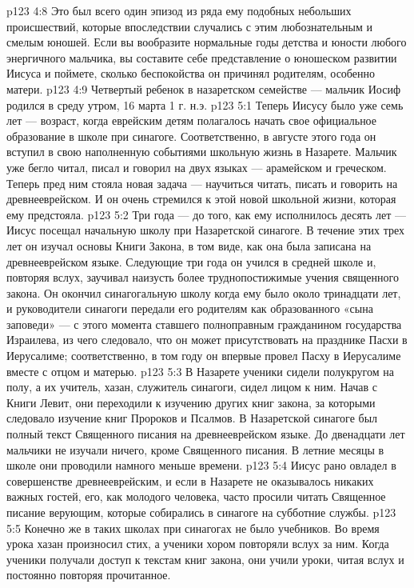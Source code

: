 \vs p123 4:8 Это был всего один эпизод из ряда ему подобных небольших происшествий, которые впоследствии случались с этим любознательным и смелым юношей. Если вы вообразите нормальные годы детства и юности любого энергичного мальчика, вы составите себе представление о юношеском развитии Иисуса и поймете, сколько беспокойства он причинял родителям, особенно матери.
\vs p123 4:9 \pc Четвертый ребенок в назаретском семействе --- мальчик Иосиф родился в среду утром, 16 марта 1 г. н.э.
\vs p123 5:1 Теперь Иисусу было уже семь лет --- возраст, когда еврейским детям полагалось начать свое официальное образование в школе при синагоге. Соответственно, в августе этого года он вступил в свою наполненную событиями школьную жизнь в Назарете. Мальчик уже бегло читал, писал и говорил на двух языках --- арамейском и греческом. Теперь пред ним стояла новая задача --- научиться читать, писать и говорить на древнееврейском. И он очень стремился к этой новой школьной жизни, которая ему предстояла.
\vs p123 5:2 Три года --- до того, как ему исполнилось десять лет --- Иисус посещал начальную школу при Назаретской синагоге. В течение этих трех лет он изучал основы Книги Закона, в том виде, как она была записана на древнееврейском языке. Следующие три года он учился в средней школе и, повторяя вслух, заучивал наизусть более труднопостижимые учения священного закона. Он окончил синагогальную школу когда ему было около тринадцати лет, и руководители синагоги передали его родителям как образованного «сына заповеди» --- с этого момента ставшего полноправным гражданином государства Израилева, из чего следовало, что он может присутствовать на празднике Пасхи в Иерусалиме; соответственно, в том году он впервые провел Пасху в Иерусалиме вместе с отцом и матерью.
\vs p123 5:3 \pc В Назарете ученики сидели полукругом на полу, а их учитель, хазан, служитель синагоги, сидел лицом к ним. Начав с Книги Левит, они переходили к изучению других книг закона, за которыми следовало изучение книг Пророков и Псалмов. В Назаретской синагоге был полный текст Священного писания на древнееврейском языке. До двенадцати лет мальчики не изучали ничего, кроме Священного писания. В летние месяцы в школе они проводили намного меньше времени.
\vs p123 5:4 Иисус рано овладел в совершенстве древнееврейским, и если в Назарете не оказывалось никаких важных гостей, его, как молодого человека, часто просили читать Священное писание верующим, которые собирались в синагоге на субботние службы.
\vs p123 5:5 Конечно же в таких школах при синагогах не было учебников. Во время урока хазан произносил стих, а ученики хором повторяли вслух за ним. Когда ученики получали доступ к текстам книг закона, они учили уроки, читая вслух и постоянно повторяя прочитанное.
